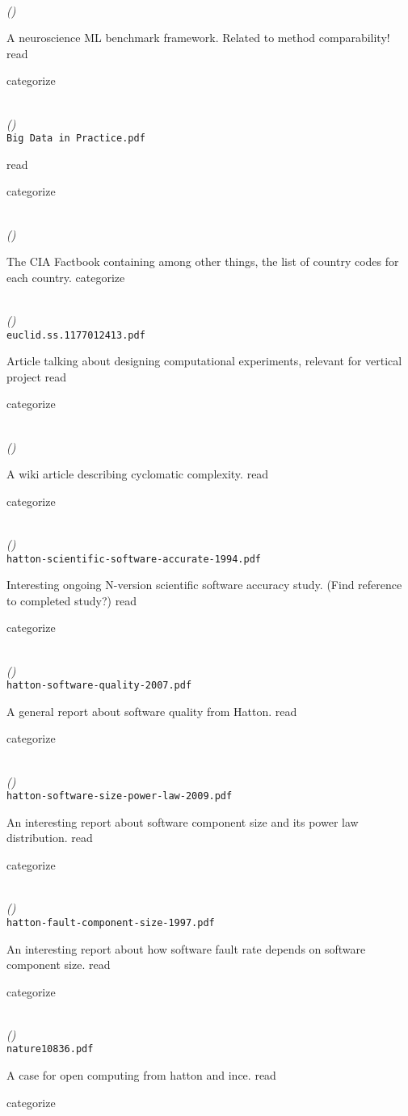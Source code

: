 \documentclass{article}
\newcommand{\Read}{
	\gls{read}
}
\newcommand{\categorize}{
	\gls{categorize}
}
\newenvironment{refdef}[2] {
	\noindent \textbf{\citetitle{#1}} \cite{#1}\\ \citejournalorbooktitle{#1} \textit{(\citeyear{#1})}\\ \texttt{#2} \vspace{0.2in} \par 
} {
\vspace{0.2in}
}
\begin{document}
\begin{refdef}{Neurofinder}{}
A neuroscience ML benchmark framework. Related to method comparability! \Read \categorize
\end{refdef}

\begin{refdef}{broussard-journalism-reproducible-2016}{Big Data in Practice.pdf}
\Read \categorize
\end{refdef}

\begin{refdef}{cia-world-factbook}{}
The CIA Factbook containing among other things, the list of country codes for each country. \categorize
\end{refdef}

\begin{refdef}{sacks1989}{euclid.ss.1177012413.pdf}
Article talking about designing computational experiments, relevant for vertical project \Read \categorize
\end{refdef}

\begin{refdef}{cyclomatic-complexity}{}
A wiki article describing cyclomatic complexity. \Read \categorize
\end{refdef}

\begin{refdef}{hatton-scientific-software-accurate-1994}{hatton-scientific-software-accurate-1994.pdf}
Interesting ongoing N-version scientific software accuracy study. (Find reference to completed study?) \Read \categorize
\end{refdef}

\begin{refdef}{hatton-software-quality-2007}{hatton-software-quality-2007.pdf}
A general report about software quality from Hatton. \Read \categorize
\end{refdef}

\begin{refdef}{hatton-software-size-power-law-2009}{hatton-software-size-power-law-2009.pdf}
An interesting report about software component size and its power law distribution. \Read \categorize
\end{refdef}

\begin{refdef}{hatton-fault-component-size-1997}{hatton-fault-component-size-1997.pdf}
An interesting report about how software fault rate depends on software component size. \Read \categorize
\end{refdef}

\begin{refdef}{ince-hatton-open-programs-2012}{nature10836.pdf}
A case for open computing from hatton and ince. \Read \categorize
\end{refdef}
\end{document}
